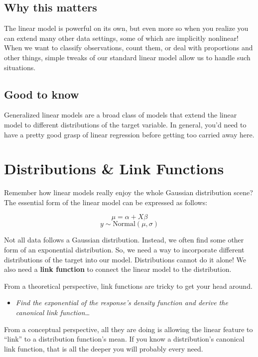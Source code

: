 \documentclass[
  letterpaper,
]{krantz}
\providecommand{\tightlist}{%
  \setlength{\itemsep}{0pt}\setlength{\parskip}{0pt}}\usepackage{longtable,booktabs,array}
\begin{document}
\subsection{Why this matters}\label{sec-glm-why}

The linear model is powerful on its own, but even more so when you
realize you can extend many other data settings, some of which are
implicitly nonlinear! When we want to classify observations, count them,
or deal with proportions and other things, simple tweaks of our standard
linear model allow us to handle such situations.

\subsection{Good to know}\label{sec-glm-good2know}

Generalized linear models are a broad class of models that extend the
linear model to different distributions of the target variable. In
general, you'd need to have a pretty good grasp of linear regression
before getting too carried away here.

\section{Distributions \& Link Functions}\label{sec-glm-distributions}

Remember how linear models really enjoy the whole Gaussian distribution
scene? The essential form of the linear model can be expressed as
follows:

\[
\mu = \alpha + X\beta
\] \[
y \sim \textrm{Normal}(\mu,\sigma)
\]

Not all data follows a Gaussian distribution. Instead, we often find
some other form of an exponential distribution. So, we need a way to
incorporate different distributions of the target into our model.
Distributions cannot do it alone! We also need a \textbf{link function}
to connect the linear model to the distribution.

From a theoretical perspective, link functions are tricky to get your
head around.

\begin{itemize}
\tightlist
\item
  \emph{Find the exponential of the response's density function and
  derive the canonical link function}\ldots{}
\end{itemize}

From a conceptual perspective, all they are doing is allowing the linear
feature to ``link'' to a distribution function's mean. If you know a
distribution's canonical link function, that is all the deeper you will
probably every need.
\end{document}

